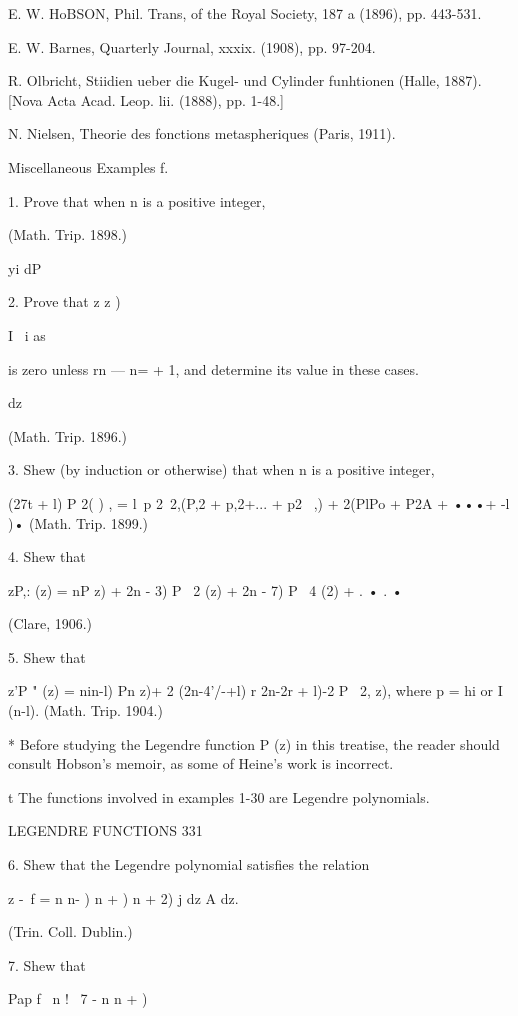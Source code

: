 {{{{E. W. HoBSON, Phil. Trans, of the Royal Society, 187 a (1896), pp.
443-531.

E. W. Barnes, Quarterly Journal, xxxix. (1908), pp. 97-204.

R. Olbricht, Stiidien ueber die Kugel- und Cylinder funhtionen (Halle,
1887). [Nova Acta Acad. Leop. lii. (1888), pp. 1-48.]

N. Nielsen, Theorie des fonctions metaspheriques (Paris, 1911).

Miscellaneous Examples f.

1. Prove that when n is a positive integer,

(Math. Trip. 1898.)



yi dP

2. Prove that z z )

I \ i as

is zero unless rn — n= + 1, and determine its value in these cases.



dz



(Math. Trip. 1896.)

3. Shew (by induction or otherwise) that when n is a positive integer,

(27t + l) P 2( ) , = l\ p 2\ 2,(P,2 + p,2+... + p2 \ ,) + 2(PlPo + P2A
+ •••+ -l )• (Math. Trip. 1899.)

4. Shew that

zP,: (z) = nP z) + 2n - 3) P \ 2 (z) + 2n - 7) P \ 4 (2) + . • . •

(Clare, 1906.)

5. Shew that

z'P " (z) = nin-l) Pn z)+ 2 (2n-4'/-+l) r 2n-2r + l)-2 P \ 2, z),
where p = hi or I (n-l). (Math. Trip. 1904.)

* Before studying the Legendre function P (z) in this treatise, the
reader should consult Hobson's memoir, as some of Heine's work is
incorrect.

t The functions involved in examples 1-30 are Legendre polynomials.



LEGENDRE FUNCTIONS 331

6. Shew that the Legendre polynomial satisfies the relation

 z -\ f = n n- ) n + ) n + 2) j dz A dz.

(Trin. Coll. Dublin.)

7. Shew that

Pap f \ n ! \ 7 - n n + ) \

}}}}
